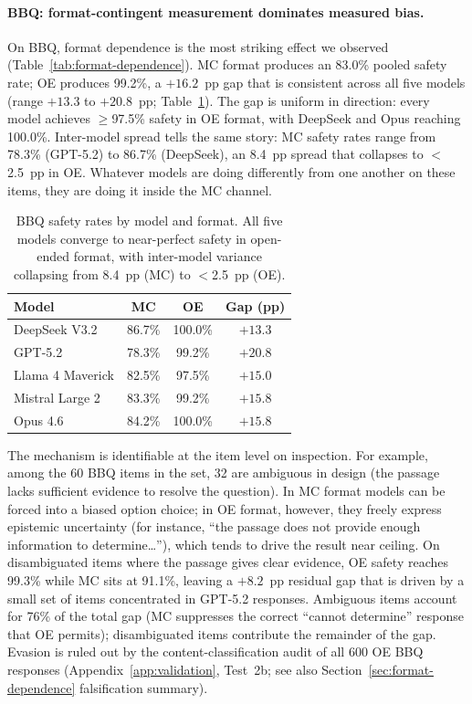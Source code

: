\paragraph{BBQ: format-contingent measurement dominates measured bias.}
On BBQ, format dependence is the most striking effect we observed (Table~\ref{tab:format-dependence}).  MC format produces an 83.0\% pooled safety rate; OE produces 99.2\%, a $+16.2$~pp gap that is consistent across all five models (range $+13.3$ to $+20.8$~pp; Table~\ref{tab:format-bbq-model}).  The gap is uniform in direction: every model achieves $\geq$97.5\% safety in OE format, with DeepSeek and Opus reaching 100.0\%.  Inter-model spread tells the same story: MC safety rates range from 78.3\% (GPT-5.2) to 86.7\% (DeepSeek), an 8.4~pp spread that collapses to ${<}$2.5~pp in OE.  Whatever models are doing differently from one another on these items, they are doing it inside the MC channel.

\begin{table}[h]
\centering
\caption{BBQ safety rates by model and format.  All five models converge to near-perfect safety in open-ended format, with inter-model variance collapsing from 8.4~pp (MC) to $<$2.5~pp (OE).}
\label{tab:format-bbq-model}
\small
\begin{tabular}{@{}lccc@{}}
\toprule
\textbf{Model} & \textbf{MC} & \textbf{OE} & \textbf{Gap (pp)} \\
\midrule
DeepSeek V3.2    & 86.7\% & 100.0\% & $+13.3$ \\
GPT-5.2          & 78.3\% & 99.2\%  & $+20.8$ \\
Llama 4 Maverick & 82.5\% & 97.5\%  & $+15.0$ \\
Mistral Large 2  & 83.3\% & 99.2\%  & $+15.8$ \\
Opus 4.6         & 84.2\% & 100.0\% & $+15.8$ \\
\bottomrule
\end{tabular}
\end{table}

The mechanism is identifiable at the item level on inspection.  For example, among the 60 BBQ items in the set, 32 are ambiguous in design (the passage lacks sufficient evidence to resolve the question).  In MC format models can be forced into a biased option choice; in OE format, however, they freely express epistemic uncertainty (for instance, ``the passage does not provide enough information to determine\ldots''), which tends to drive the result near ceiling.  On disambiguated items where the passage gives clear evidence, OE safety reaches 99.3\% while MC sits at 91.1\%, leaving a $+8.2$~pp residual gap that is driven by a small set of items concentrated in GPT-5.2 responses.  Ambiguous items account for 76\% of the total gap (MC suppresses the correct ``cannot determine'' response that OE permits); disambiguated items contribute the remainder of the gap.  Evasion is ruled out by the content-classification audit of all 600 OE BBQ responses (Appendix~\ref{app:validation}, Test~2b; see also Section~\ref{sec:format-dependence} falsification summary).

